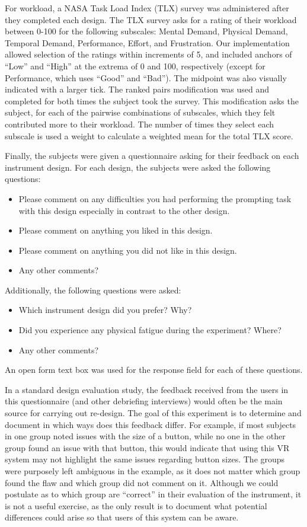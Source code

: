 For workload, a NASA Task Load Index (TLX) survey was administered after they completed each design.
The TLX survey asks for a rating of their workload between 0-100 for the following subscales: Mental Demand, Physical Demand, Temporal Demand, Performance, Effort, and Frustration.
Our implementation allowed selection of the ratings within increments of 5, and included anchors of ``Low'' and ``High'' at the extrema of 0 and 100, respectively (except for Performance, which uses ``Good'' and ``Bad'').
The midpoint was also visually indicated with a larger tick.
The ranked pairs modification was used and completed for both times the subject took the survey.
This modification asks the subject, for each of the pairwise combinations of subscales, which they felt contributed more to their workload.
The number of times they select each subscale is used a weight to calculate a weighted mean for the total TLX score.

Finally, the subjects were given a questionnaire asking for their feedback on each instrument design.
For each design, the subjects were asked the following questions:
\begin{itemize}
    \item Please comment on any difficulties you had performing the prompting task with this design especially in contrast to the other design.
    \item Please comment on anything you liked in this design.
    \item Please comment on anything you did not like in this design.
    \item Any other comments?
\end{itemize}
Additionally, the following questions were asked:
\begin{itemize}
    \item Which instrument design did you prefer? Why?
    \item Did you experience any physical fatigue during the experiment? Where?
    \item Any other comments?
\end{itemize}
An open form text box was used for the response field for each of these questions.

In a standard design evaluation study, the feedback received from the users in this questionnaire (and other debriefing interviews) would often be the main source for carrying out re-design.
The goal of this experiment is to determine and document in which ways does this feedback differ.
For example, if most subjects in one group noted issues with the size of a button, while no one in the other group found an issue with that button, this would indicate that using this VR system may not highlight the same issues regarding button sizes.
The groups were purposely left ambiguous in the example, as it does not matter which group found the flaw and which group did not comment on it.
Although we could postulate as to which group are ``correct'' in their evaluation of the instrument, it is not a useful exercise, as the only result is to document what potential differences could arise so that users of this system can be aware.

